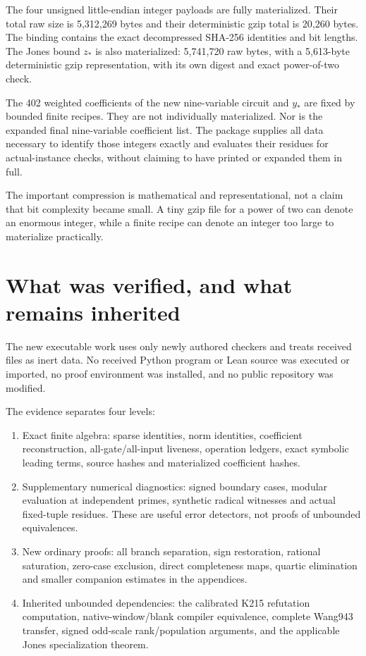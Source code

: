 \documentclass[
  10pt,
]{article}
\providecommand{\tightlist}{%
  \setlength{\itemsep}{0pt}\setlength{\parskip}{0pt}}
\let\oldsection\section
\renewcommand{\section}{\clearpage\oldsection}
\begin{document}
The four unsigned little-endian integer payloads are fully materialized.
Their total raw size is 5,312,269 bytes and their deterministic gzip
total is 20,260 bytes. The binding contains the exact decompressed
SHA-256 identities and bit lengths. The Jones bound \(z_*\) is also
materialized: 5,741,720 raw bytes, with a 5,613-byte deterministic gzip
representation, with its own digest and exact power-of-two check.

The 402 weighted coefficients of the new nine-variable circuit and
\(y_*\) are fixed by bounded finite recipes. They are not individually
materialized. Nor is the expanded final nine-variable coefficient list.
The package supplies all data necessary to identify those integers
exactly and evaluates their residues for actual-instance checks, without
claiming to have printed or expanded them in full.

The important compression is mathematical and representational, not a
claim that bit complexity became small. A tiny gzip file for a power of
two can denote an enormous integer, while a finite recipe can denote an
integer too large to materialize practically.

\section{What was verified, and what remains
inherited}\label{what-was-verified-and-what-remains-inherited}

The new executable work uses only newly authored checkers and treats
received files as inert data. No received Python program or Lean source
was executed or imported, no proof environment was installed, and no
public repository was modified.

The evidence separates four levels:

\begin{enumerate}
\def\labelenumi{\arabic{enumi}.}
\tightlist
\item
  Exact finite algebra: sparse identities, norm identities, coefficient
  reconstruction, all-gate/all-input liveness, operation ledgers, exact
  symbolic leading terms, source hashes and materialized coefficient
  hashes.
\item
  Supplementary numerical diagnostics: signed boundary cases, modular
  evaluation at independent primes, synthetic radical witnesses and
  actual fixed-tuple residues. These are useful error detectors, not
  proofs of unbounded equivalences.
\item
  New ordinary proofs: all branch separation, sign restoration, rational
  saturation, zero-case exclusion, direct completeness maps, quartic
  elimination and smaller companion estimates in the appendices.
\item
  Inherited unbounded dependencies: the calibrated K215 refutation
  computation, native-window/blank compiler equivalence, complete
  Wang943 transfer, signed odd-scale rank/population arguments, and the
  applicable Jones specialization theorem.
\end{enumerate}
\end{document}

